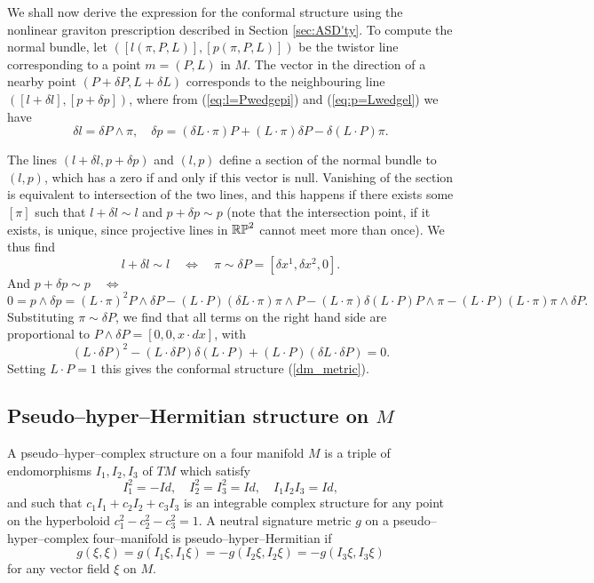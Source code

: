 We shall now derive the expression for the conformal structure using the nonlinear graviton prescription described in Section \ref{sec:ASD'ty}. To compute the normal bundle, let $([l(\pi, P, L)], 
[p(\pi, P, L)])$
be the twistor line corresponding to a point $m=(P, L)$ in $M$. The vector in the direction of a nearby point $(P+\delta P,L+\delta L)$ corresponds to the neighbouring line $([l+\delta l], [p+\delta p])$, where from (\ref{eq:l=Pwedgepi}) and (\ref{eq:p=Lwedgel}) we have
\[
\delta l=\delta P\wedge \pi, \quad
\delta p= (\delta L\cdot \pi)P+(L\cdot\pi) \delta P-\delta (L\cdot P)\pi.
\]

The lines  $(l+\delta l, p+\delta p)$  and $(l, p)$ define a section of the normal bundle to $(l,p)$, which has a zero if and only if this vector is null. Vanishing of the section is equivalent to intersection of the two lines, and this happens if there exists some $[\pi]$ such that $l+\delta l\sim l$ and $p+\delta p\sim p$ (note that the intersection point, if it exists, is unique, since projective lines in $\mathbb{RP}^2$ cannot meet more than once). We thus find
\[
l+\delta l\sim l \quad \iff \quad\pi\sim\delta P=[\delta x^1, \delta x^2, 0].
\]
And $p+\delta p\sim p \quad \iff$
\[
0=p\wedge \delta p=(L\cdot \pi)^2P\wedge \delta P-(L\cdot P)
(\delta L\cdot \pi)\pi\wedge P-(L\cdot \pi)\delta (L\cdot P)P\wedge \pi-
(L\cdot P)(L\cdot \pi) \pi\wedge \delta P.
\]
Substituting $\pi\sim\delta P$, we find that all terms on the right hand side are proportional to $P\wedge \delta P=[0, 0, x\cdot dx]$, with
\[
(L\cdot \delta P)^2-(L\cdot \delta P)\delta(L\cdot P)+(L\cdot P)(\delta L\cdot \delta P)=0.
\]
Setting $L\cdot P=1$ this gives the conformal structure 
(\ref{dm_metric}).
\subsection{Pseudo--hyper--Hermitian structure on $M$}
A pseudo--hyper--complex structure on a four manifold $M$ is a triple of endomorphisms
$I_1, I_2, I_3$ of $TM$ which satisfy
\[
I_1^2=-Id, \quad I_2^2=I_3^2=Id, \quad I_1I_2I_3=Id,
\]
and such that $c_1I_1+c_2I_2+c_3I_3$ is an integrable complex structure for any point 
on the hyperboloid $c_1^2-c_2^2-c_3^2=1$.
A neutral signature metric $g$ on a pseudo--hyper--complex four--manifold is pseudo--hyper--Hermitian
if
\[
g(\xi, \xi)=g(I_1\xi, I_1\xi)=-g(I_2\xi, I_2\xi)=-g(I_3\xi, I_3\xi)
\]
for any vector field $\xi$ on $M$.

